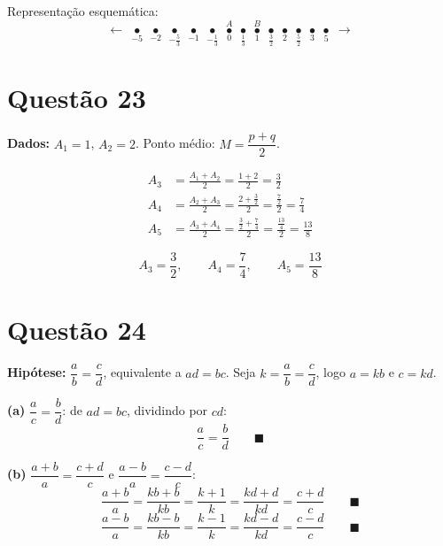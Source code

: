 \documentclass[12pt,a4paper]{article}
\begin{document}
Representa\c{c}\~ao esquem\'atica:
$$\longleftarrow\; \underset{-5}{\bullet}\;\underset{-2}{\bullet}\;\underset{-\frac{5}{3}}{\bullet}\;\underset{-1}{\bullet}\;\underset{-\frac{1}{3}}{\bullet}\;\underset{0}{\overset{A}{\bullet}}\;\underset{\frac{1}{3}}{\bullet}\;\underset{1}{\overset{B}{\bullet}}\;\underset{\frac{3}{2}}{\bullet}\;\underset{2}{\bullet}\;\underset{\frac{5}{2}}{\bullet}\;\underset{3}{\bullet}\;\underset{5}{\bullet}\;\longrightarrow$$

\section*{Quest\~ao 23}

\textbf{Dados:} $A_1 = 1$, $A_2 = 2$. Ponto m\'edio: $M = \dfrac{p+q}{2}$.

\begin{align*}
A_3 &= \frac{A_1 + A_2}{2} = \frac{1+2}{2} = \frac{3}{2}\\[6pt]
A_4 &= \frac{A_2 + A_3}{2} = \frac{2 + \frac{3}{2}}{2} = \frac{\frac{7}{2}}{2} = \frac{7}{4}\\[6pt]
A_5 &= \frac{A_3 + A_4}{2} = \frac{\frac{3}{2} + \frac{7}{4}}{2} = \frac{\frac{13}{4}}{2} = \frac{13}{8}
\end{align*}

$$\boxed{A_3 = \frac{3}{2},\qquad A_4 = \frac{7}{4},\qquad A_5 = \frac{13}{8}}$$

\section*{Quest\~ao 24}

\textbf{Hip\'otese:} $\dfrac{a}{b} = \dfrac{c}{d}$, equivalente a $ad = bc$. Seja $k = \dfrac{a}{b} = \dfrac{c}{d}$, logo $a = kb$ e $c = kd$.

\textbf{(a)} $\dfrac{a}{c} = \dfrac{b}{d}$: de $ad = bc$, dividindo por $cd$:
$$\frac{a}{c} = \frac{b}{d} \qquad \blacksquare$$

\textbf{(b)} $\dfrac{a+b}{a} = \dfrac{c+d}{c}$ e $\dfrac{a-b}{a} = \dfrac{c-d}{c}$:
$$\frac{a+b}{a} = \frac{kb+b}{kb} = \frac{k+1}{k} = \frac{kd+d}{kd} = \frac{c+d}{c} \qquad \blacksquare$$
$$\frac{a-b}{a} = \frac{kb-b}{kb} = \frac{k-1}{k} = \frac{kd-d}{kd} = \frac{c-d}{c} \qquad \blacksquare$$
\end{document}
